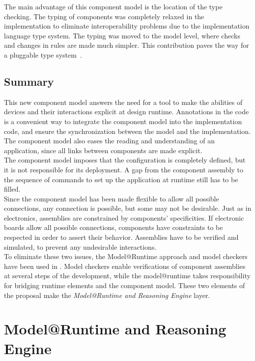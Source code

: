 The main advantage of this component model is the location of the type checking. The typing of components was completely relaxed in the implementation to eliminate interoperability problems due to the implementation language type system. The typing was moved to the model level, where checks and changes in rules are made much simpler. This contribution paves the way for a pluggable type system~\cite{PapiACPE2008,Bracha:2004}.\\


\subsection{Summary}

This new component model answers the need for a tool to make the abilities of devices and their interactions explicit at design runtime. Annotations in the code is a convenient way to integrate the component model into the implementation code, and ensure the synchronization between the model and the implementation. The component model also eases the reading and understanding of an application, since all links between components are made explicit.\\

The component model imposes that the configuration is completely defined, but it is not responsible for its deployment. A gap from the component assembly to the sequence of commands to set up the application at runtime still has to be filled.\\
Since the component model has been made flexible to allow all possible connections, any connection is possible, but some may not be desirable. Just as in electronics, assemblies are constrained by components' specificities. If electronic boards allow all possible connections, components have constraints to be respected in order to assert their behavior. Assemblies have to be verified and simulated, to prevent any undesirable interactions.\\

To eliminate these two issues, the Model@Runtime approach and model checkers have been used in \enti{}. Model checkers enable verifications of component assemblies at several steps of the development, while the model@runtime takes responsibility for bridging runtime elements and the component model. These two elements of the proposal make the {\it Model@Runtime and Reasoning Engine} layer.\\


\section{Model@Runtime and Reasoning Engine}
\label{sec:martAndReasoning}

